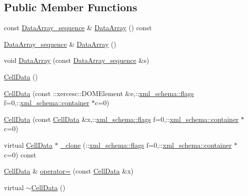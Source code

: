 \subsection*{Public Member Functions}
\begin{DoxyCompactItemize}
\item 
const \hyperlink{classCellData_a52b0c8e18ccdb06ed9e6ae76cd809c4a}{Data\+Array\+\_\+sequence} \& \hyperlink{classCellData_af12d2f299905eca541a999dafba1e7e3}{Data\+Array} () const 
\item 
\hyperlink{classCellData_a52b0c8e18ccdb06ed9e6ae76cd809c4a}{Data\+Array\+\_\+sequence} \& \hyperlink{classCellData_ac40c7e291f83e3e9fabfddeef14131f5}{Data\+Array} ()
\item 
void \hyperlink{classCellData_a9ee9fc1ef295b3ad2c4dc3e9e70ac357}{Data\+Array} (const \hyperlink{classCellData_a52b0c8e18ccdb06ed9e6ae76cd809c4a}{Data\+Array\+\_\+sequence} \&s)
\item 
\hyperlink{classCellData_a0d89ba23195659a1fcdc714fa27697a5}{Cell\+Data} ()
\item 
\hyperlink{classCellData_ac98b30101e2448016bfa96b9fa6ee18a}{Cell\+Data} (const \+::xercesc\+::\+D\+O\+M\+Element \&e,\+::\hyperlink{namespacexml__schema_a0612287d030cb2732d31a45b258fdc87}{xml\+\_\+schema\+::flags} f=0,\+::\hyperlink{namespacexml__schema_ada9aa30dc722e93ee2ed7243085402a5}{xml\+\_\+schema\+::container} $\ast$c=0)
\item 
\hyperlink{classCellData_ae93656ff9893f518c8f1cfdc611c8045}{Cell\+Data} (const \hyperlink{classCellData}{Cell\+Data} \&x,\+::\hyperlink{namespacexml__schema_a0612287d030cb2732d31a45b258fdc87}{xml\+\_\+schema\+::flags} f=0,\+::\hyperlink{namespacexml__schema_ada9aa30dc722e93ee2ed7243085402a5}{xml\+\_\+schema\+::container} $\ast$c=0)
\item 
virtual \hyperlink{classCellData}{Cell\+Data} $\ast$ \hyperlink{classCellData_aa17c3a153b3a7692dca562878f3fe3ad}{\+\_\+clone} (\+::\hyperlink{namespacexml__schema_a0612287d030cb2732d31a45b258fdc87}{xml\+\_\+schema\+::flags} f=0,\+::\hyperlink{namespacexml__schema_ada9aa30dc722e93ee2ed7243085402a5}{xml\+\_\+schema\+::container} $\ast$c=0) const 
\item 
\hyperlink{classCellData}{Cell\+Data} \& \hyperlink{classCellData_a42d87874818d38a583d898832b54b7fa}{operator=} (const \hyperlink{classCellData}{Cell\+Data} \&x)
\item 
virtual \hyperlink{classCellData_aaf439852120aadb5a267799e2a7bf2a3}{$\sim$\+Cell\+Data} ()
\end{DoxyCompactItemize}
